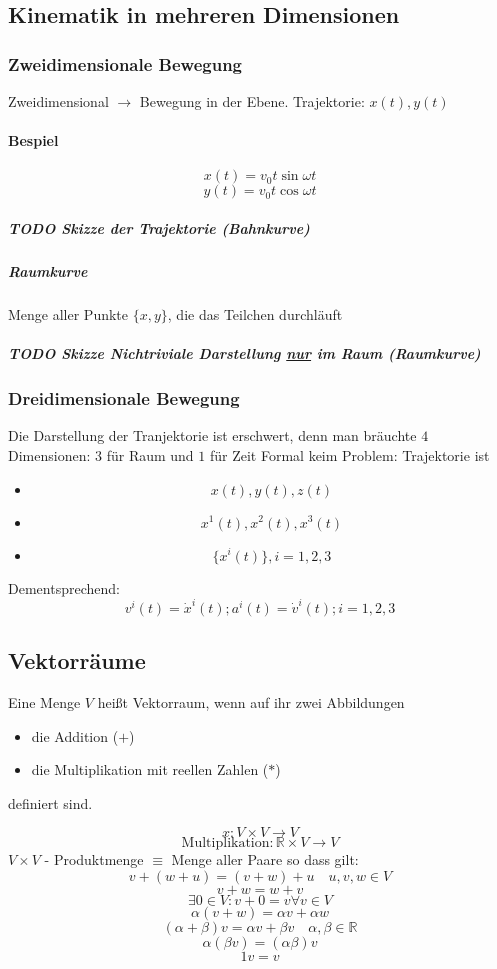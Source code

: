 \documentclass[a4paper]{scrartcl}
\DeclareMathOperator{\Forall}{\forall}
\theoremstyle{definition}
\theoremstyle{plain}
\theoremstyle{remark}
\theoremstyle{remark}
\begin{document}
\subsection{Kinematik in mehreren Dimensionen}
\label{sec-2-3}
\subsubsection{Zweidimensionale Bewegung}
\label{sec-2-3-1}
Zweidimensional $\rightarrow$ Bewegung in der Ebene. Trajektorie: $x(t),y(t)$
\paragraph{Bespiel}
\label{sec-2-3-1-1}
\[x(t) = v_0 t \sin{\omega t}\]
\[y(t) = v_0 t \cos{\omega t}\]
\subparagraph{{\bfseries\sffamily TODO} Skizze der Trajektorie (Bahnkurve)}
\label{sec-2-3-1-1-1}
\subparagraph{Raumkurve}
\label{sec-2-3-1-1-2}
Menge aller Punkte $\{x,y\}$, die das Teilchen durchläuft
\subparagraph{{\bfseries\sffamily TODO} Skizze Nichtriviale Darstellung \underline{nur} im Raum (Raumkurve)}
\label{sec-2-3-1-1-3}
\subsubsection{Dreidimensionale Bewegung}
\label{sec-2-3-2}
Die Darstellung der Tranjektorie ist erschwert, denn man bräuchte $4$ Dimensionen: $3$ für Raum und $1$ für Zeit
Formal keim Problem: Trajektorie ist
\begin{itemize}
\item \[x(t),y(t),z(t)\]
\item \[x^1(t),x^2(t),x^3(t)\]
\item \[\{x^i(t)\},i=1,2,3\]
\end{itemize}

Dementsprechend:
\[v^i(t) = \dot{x}^i(t); a^i(t) = \dot{v}^i(t); i=1,2,3\]
\subsection{Vektorräume}
\label{sec-2-4}
Eine Menge $V$ heißt Vektorraum, wenn auf ihr zwei Abbildungen
\begin{itemize}
\item die Addition ($+$)
\item die Multiplikation mit reellen Zahlen ($*$)
\end{itemize}
definiert sind.

\[x : V\times V \rightarrow V\]
\[\text{Multiplikation}: \mathbb{R}\times V \rightarrow V\]
$V\times V$ - Produktmenge $\equiv$ Menge aller Paare
so dass gilt:
\[v + (w + u) = (v + w) + u\quad u,v,w\in V\tag*{Assoziativität}\]
\[v+w = w+v\tag*{Kommutativität}\]
\[\exists 0 \in V: v + 0 = v \Forall v\in V\tag*{Null}\]
\[\alpha(v+w) = \alpha v + \alpha w \tag*{Distributvität}\]
\[(\alpha + \beta)v = \alpha v + \beta v \quad \alpha,\beta \in \mathbb{R}\tag*{Distributivität}\]
\[\alpha(\beta v) = (\alpha\beta) v\tag*{Assoziativität der Multiplikation}\]
\[1 v = v \tag*{Multiplikation mit Eins}\]
\end{document}
